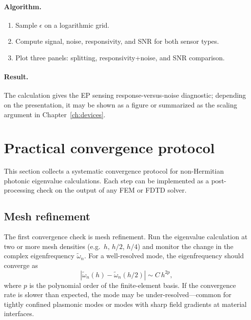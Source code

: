 \paragraph{Algorithm.}
\begin{enumerate}
 \item Sample $\epsilon$ on a logarithmic grid.
 \item Compute signal, noise, responsivity, and SNR for both sensor
 types.
 \item Plot three panels: splitting, responsivity+noise, and SNR
 comparison.
\end{enumerate}

\paragraph{Result.}
The calculation gives the EP sensing response-versus-noise diagnostic;
depending on the presentation, it may be shown as a figure or summarized
as the scaling argument in Chapter~\ref{ch:devices}.


\section{Practical convergence protocol}
\label{sec:convergence-protocol}

This section collects a systematic convergence protocol for
non-Hermitian photonic eigenvalue calculations. Each step can be
implemented as a post-processing check on the output of any FEM or
FDTD solver.

\subsection{Mesh refinement}
\label{ssec:mesh-convergence}

The first convergence check is mesh refinement. Run the eigenvalue
calculation at two or more mesh densities (e.g.\ $h$, $h/2$, $h/4$)
and monitor the change in the complex eigenfrequency
$\tilde{\omega}_n$. For a well-resolved mode, the eigenfrequency
should converge as
\begin{equation}
 |\tilde{\omega}_n(h) - \tilde{\omega}_n(h/2)|
 \sim C\,h^{2p},
 \label{eq:mesh-convergence}
\end{equation}
where $p$ is the polynomial order of the finite-element basis. If
the convergence rate is slower than expected, the mode may be
under-resolved---common for tightly confined plasmonic modes or modes
with sharp field gradients at material interfaces.

